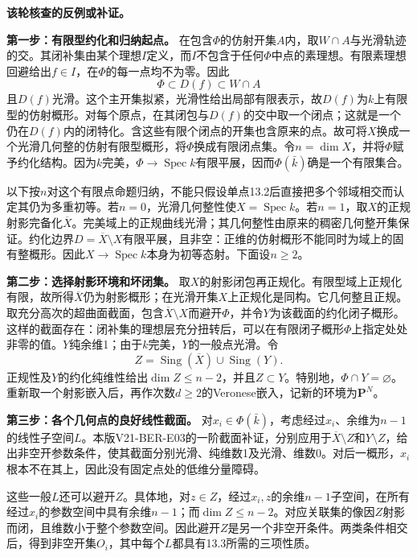 \documentclass[UTF8,a4paper]{ctexbook}
\DeclareMathOperator{\Spec}{Spec}
\newcommand{\lead}[1]{\par\noindent\textbf{#1}\quad}
\newenvironment{analysisproof}{\par\noindent\textbf{该轮核查的反例或补证。}\ }{\par}
\begin{document}
\begin{analysisproof}
\lead{第一步：有限型约化和归纳起点。}
在包含$\Phi$的仿射开集$A$内，取$W\cap A$与光滑轨迹的交。其闭补集由某个理想$I$定义，而$I$不包含于任何$\Phi$中点的素理想。有限素理想回避给出$f\in I$，在$\Phi$的每一点均不为零。因此
\[
\Phi\subset D(f)\subset W\cap A
\]
且$D(f)$光滑。这个主开集拟紧，光滑性给出局部有限表示，故$D(f)$为$k$上有限型的仿射概形。对每个原点，在其闭包与$D(f)$的交中取一个闭点；这就是一个仍在$D(f)$内的闭特化。含这些有限个闭点的开集也含原来的点。故可将$X$换成一个光滑几何整的仿射有限型概形，将$\Phi$换成有限闭点集。令$n=\dim X$，并将$\Phi$赋予约化结构。因为$k$完美，$\Phi\to\Spec k$有限平展，因而$\Phi(\bar k)$确是一个有限集合。

以下按$n$对这个有限点命题归纳，不能只假设单点13.2后直接把多个邻域相交而认定其仍为多重初等。若$n=0$，光滑几何整性使$X=\Spec k$。若$n=1$，取$X$的正规射影完备化$\overline X$。完美域上的正规曲线光滑；其几何整性由原来的稠密几何整开集保证。约化边界$D=\overline X\setminus X$有限平展，且非空：正维的仿射概形不能同时为域上的固有整概形。因此$X\to\Spec k$本身为初等态射。下面设$n\geq2$。

\lead{第二步：选择射影环境和坏闭集。}
取$X$的射影闭包再正规化。有限型域上正规化有限，故所得$\overline X$仍为射影概形；在光滑开集$X$上正规化是同构。它几何整且正规。取充分高次的超曲面截面，包含$\overline X\setminus X$而避开$\Phi$，并令$Y$为该截面的约化闭子概形。这样的截面存在：闭补集的理想层充分扭转后，可以在有限闭子概形$\Phi$上指定处处非零的值。$Y$纯余维1；由于$k$完美，$Y$的一般点光滑。令
\[
Z=\operatorname{Sing}(\overline X)\cup\operatorname{Sing}(Y).
\]
正规性及$Y$的约化纯维性给出$\dim Z\leq n-2$，并且$Z\subset Y$。特别地，$\Phi\cap Y=\varnothing$。重新取一个射影嵌入后，再作次数$d\geq2$的Veronese嵌入，记新的环境为$\mathbf P^N$。

\lead{第三步：各个几何点的良好线性截面。}
对$x_i\in\Phi(\bar k)$，考虑经过$x_i$、余维为$n-1$的线性子空间$L$。本版V21-BER-E03的一阶截面补证，分别应用于$\overline X\setminus Z$和$Y\setminus Z$，给出非空开参数条件，使其截面分别光滑、纯维数1及光滑、维数0。对后一概形，$x_i$根本不在其上，因此没有固定点处的低维分量障碍。

这些一般$L$还可以避开$Z$。具体地，对$z\in Z$，经过$x_i,z$的余维$n-1$子空间，在所有经过$x_i$的参数空间中具有余维$n-1$；而$\dim Z\leq n-2$。对应关联集的像因$Z$射影而闭，且维数小于整个参数空间。因此避开$Z$是另一个非空开条件。两类条件相交后，得到非空开集$O_i$，其中每个$L$都具有13.3所需的三项性质。


\end{analysisproof}
\end{document}
